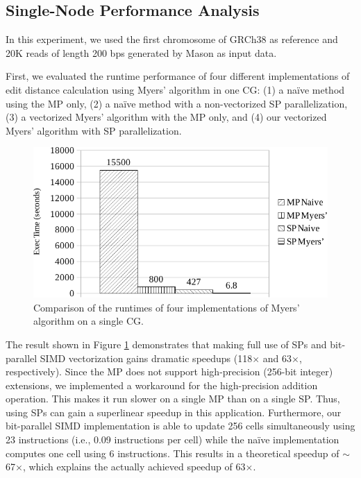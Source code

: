 \documentclass[conference]{IEEEtran}
\begin{document}
\subsection{Single-Node Performance Analysis}

In this experiment, we used the first chromosome of GRCh38 as reference and 20K reads of length 200 bps generated by Mason as input data. 

First, we evaluated the runtime performance of four different implementations of edit distance calculation using Myers' algorithm in one CG: (1) a na\"ive method using the MP only, (2) a na\"ive method with a non-vectorized SP parallelization, (3) a vectorized Myers' algorithm with the MP only, and (4) our vectorized Myers' algorithm with SP parallelization. 

\begin{figure}[!htb]
	\begin{center}
		\includegraphics[width=1\linewidth]{figures/VarVerCha}
		\caption{Comparison of the runtimes of four implementations of Myers' algorithm on a single CG.}
		\label{VarVerCha}
	\end{center}
\end{figure}

The result shown in Figure \ref{VarVerCha} demonstrates that making full use of SPs and bit-parallel SIMD vectorization gains dramatic speedups (118$\times$ and 63$\times$, respectively). Since the MP does not support high-precision (256-bit integer) extensions, we implemented a workaround for the high-precision addition operation. This makes it run slower on a single MP than on a single SP. Thus, using SPs can gain a superlinear speedup in this application. Furthermore, our bit-parallel SIMD implementation is able to update 256 cells simultaneously using 23 instructions (i.e., 0.09 instructions per cell) while the na\"ive implementation computes one cell using 6 instructions. This results in a theoretical speedup of $\sim$67$\times$, which explains the actually achieved speedup of 63$\times$.
\end{document}
